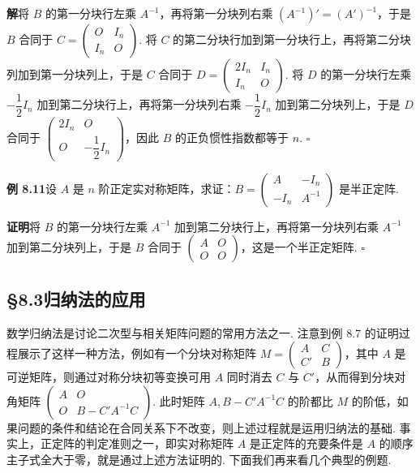 \documentclass[UTF8, 12pt, fontset=fandol, oneside]{ctexart}
\begin{document}
\noindent\textbf{解}\quad 将 $B$ 的第一分块行左乘 $A^{-1}$，再将第一分块列右乘 $(A^{-1})'=(A')^{-1}$，于是 $B$ 合同于 $C=\left(\begin{array}{cc}O&I_n\\ I_n&O\end{array}\right)$. 将 $C$ 的第二分块行加到第一分块行上，再将第二分块列加到第一分块列上，于是 $C$ 合同于 $D=\left(\begin{array}{cc}2I_n&I_n\\ I_n&O\end{array}\right)$. 将 $D$ 的第一分块行左乘 $-\dfrac12 I_n$ 加到第二分块行上，再将第一分块列右乘 $-\dfrac12 I_n$ 加到第二分块列上，于是 $D$ 合同于 $\left(\begin{array}{cc}2I_n&O\\ O&-\dfrac12 I_n\end{array}\right)$，因此 $B$ 的正负惯性指数都等于 $n$. $\ensuremath{\square}$

\noindent\textbf{例 8.11}\quad 设 $A$ 是 $n$ 阶正定实对称矩阵，求证：$B=\left(\begin{array}{cc}A&-I_n\\ -I_n&A^{-1}\end{array}\right)$ 是半正定阵.

\noindent\textbf{证明}\quad 将 $B$ 的第一分块行左乘 $A^{-1}$ 加到第二分块行上，再将第一分块列右乘 $A^{-1}$ 加到第二分块列上，于是 $B$ 合同于 $\left(\begin{array}{cc}A&O\\ O&O\end{array}\right)$，这是一个半正定矩阵. $\ensuremath{\square}$

\subsection*{§8.3\quad 归纳法的应用}

数学归纳法是讨论二次型与相关矩阵问题的常用方法之一. 注意到例 8.7 的证明过程展示了这样一种方法，例如有一个分块对称矩阵 $M=\left(\begin{array}{cc}A&C\\ C'&B\end{array}\right)$，其中 $A$ 是可逆矩阵，则通过对称分块初等变换可用 $A$ 同时消去 $C$ 与 $C'$，从而得到分块对角矩阵 $\left(\begin{array}{cc}A&O\\ O&B-C'A^{-1}C\end{array}\right)$. 此时矩阵 $A,B-C'A^{-1}C$ 的阶都比 $M$ 的阶低，如果问题的条件和结论在合同关系下不改变，则上述过程就是运用归纳法的基础. 事实上，正定阵的判定准则之一，即实对称矩阵 $A$ 是正定阵的充要条件是 $A$ 的顺序主子式全大于零，就是通过上述方法证明的. 下面我们再来看几个典型的例题.
\end{document}
